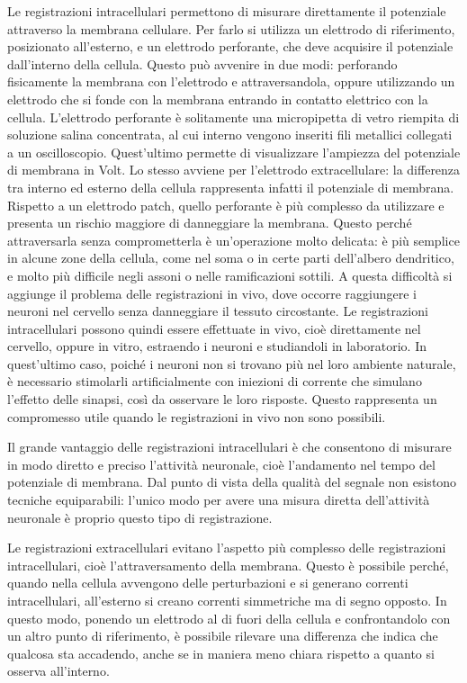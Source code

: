 \documentclass[12pt,a4paper]{book}
\begin{document}
Le registrazioni intracellulari permettono di misurare direttamente il potenziale attraverso la membrana cellulare. Per farlo si utilizza un elettrodo di riferimento, posizionato all'esterno, e un elettrodo perforante, che deve acquisire il potenziale dall'interno della cellula. Questo può avvenire in due modi: perforando fisicamente la membrana con l'elettrodo e attraversandola, oppure utilizzando un elettrodo che si fonde con la membrana entrando in contatto elettrico con la cellula. L'elettrodo perforante è solitamente una micropipetta di vetro riempita di soluzione salina concentrata, al cui interno vengono inseriti fili metallici collegati a un oscilloscopio. Quest'ultimo permette di visualizzare l'ampiezza del potenziale di membrana in Volt. Lo stesso avviene per l'elettrodo extracellulare: la differenza tra interno ed esterno della cellula rappresenta infatti il potenziale di membrana. Rispetto a un elettrodo patch, quello perforante è più complesso da utilizzare e presenta un rischio maggiore di danneggiare la membrana. Questo perché attraversarla senza comprometterla è un'operazione molto delicata: è più semplice in alcune zone della cellula, come nel soma o in certe parti dell'albero dendritico, e molto più difficile negli assoni o nelle ramificazioni sottili. A questa difficoltà si aggiunge il problema delle registrazioni in vivo, dove occorre raggiungere i neuroni nel cervello senza danneggiare il tessuto circostante. Le registrazioni intracellulari possono quindi essere effettuate in vivo, cioè direttamente nel cervello, oppure in vitro, estraendo i neuroni e studiandoli in laboratorio. In quest'ultimo caso, poiché i neuroni non si trovano più nel loro ambiente naturale, è necessario stimolarli artificialmente con iniezioni di corrente che simulano l'effetto delle sinapsi, così da osservare le loro risposte. Questo rappresenta un compromesso utile quando le registrazioni in vivo non sono possibili.

Il grande vantaggio delle registrazioni intracellulari è che consentono di misurare in modo diretto e preciso l'attività neuronale, cioè l'andamento nel tempo del potenziale di membrana. Dal punto di vista della qualità del segnale non esistono tecniche equiparabili: l'unico modo per avere una misura diretta dell'attività neuronale è proprio questo tipo di registrazione.

Le registrazioni extracellulari evitano l'aspetto più complesso delle registrazioni intracellulari, cioè l'attraversamento della membrana. Questo è possibile perché, quando nella cellula avvengono delle perturbazioni e si generano correnti intracellulari, all'esterno si creano correnti simmetriche ma di segno opposto. In questo modo, ponendo un elettrodo al di fuori della cellula e confrontandolo con un altro punto di riferimento, è possibile rilevare una differenza che indica che qualcosa sta accadendo, anche se in maniera meno chiara rispetto a quanto si osserva all'interno.
\end{document}
